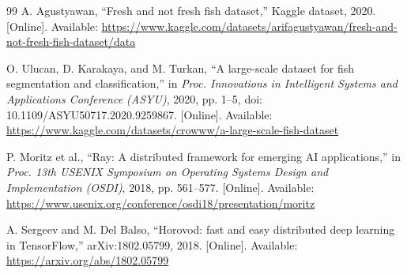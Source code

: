 ﻿\documentclass[6p,10pt,times]{ieeeaccess}
\begin{document}
\begin{thebibliography}{99}
A. Agustyawan, ``Fresh and not fresh fish dataset,'' Kaggle dataset, 2020. [Online]. Available: \url{https://www.kaggle.com/datasets/arifagustyawan/fresh-and-not-fresh-fish-dataset/data}

O. Ulucan, D. Karakaya, and M. Turkan, ``A large-scale dataset for fish segmentation and classification,'' in \emph{Proc. Innovations in Intelligent Systems and Applications Conference (ASYU)}, 2020, pp. 1--5, doi: 10.1109/ASYU50717.2020.9259867. [Online]. Available: \url{https://www.kaggle.com/datasets/crowww/a-large-scale-fish-dataset}

P. Moritz et al., ``Ray: A distributed framework for emerging AI applications,'' in \emph{Proc. 13th USENIX Symposium on Operating Systems Design and Implementation (OSDI)}, 2018, pp. 561--577. [Online]. Available: \url{https://www.usenix.org/conference/osdi18/presentation/moritz}

A. Sergeev and M. Del Balso, ``Horovod: fast and easy distributed deep learning in TensorFlow,'' arXiv:1802.05799, 2018. [Online]. Available: \url{https://arxiv.org/abs/1802.05799}

\end{thebibliography}

\EOD
\end{document}
